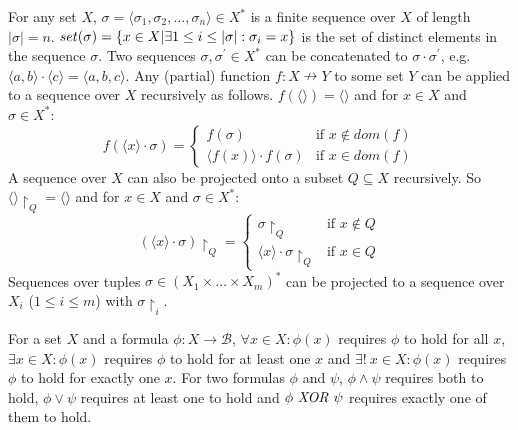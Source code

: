 \begin{definition}[Sequences]
For any set $X$, $\sigma = \langle \sigma_1, \sigma_2, \ldots, \sigma_n \rangle \in X^*$ is a finite sequence over $X$ of length $|\sigma|=n$. $set(\sigma) = \{x\in X|\exists 1 \le i \le |\sigma|: \sigma_i = x\}$ is the set of distinct elements in the sequence $\sigma$.
Two sequences $\sigma, \sigma^\prime \in X^*$ can be concatenated to $\sigma \cdot \sigma^\prime$, e.g. $\langle a,b \rangle \cdot \langle c \rangle = \langle a, b, c \rangle$.
Any (partial) function $f:X \nrightarrow Y$ to some set $Y$ can be applied to a sequence over $X$ recursively as follows. $f(\langle \rangle) = \langle \rangle$ and for $x\in X$ and $\sigma \in X^*$: 
$$f(\langle x \rangle \cdot \sigma) = \begin{cases}
f(\sigma) & \text{if } x\notin dom(f)\\
\langle f(x) \rangle \cdot f(\sigma) & \text{if } x \in dom(f)
\end{cases}$$
A sequence over $X$ can also be projected onto a subset $Q\subseteq X$ recursively. So $\langle \rangle \restriction_Q = \langle \rangle$ and for $x\in X$ and $\sigma \in X^*$: $$(\langle x \rangle \cdot \sigma)\restriction_Q = \begin{cases}
\sigma\restriction_Q & \text{if } x\notin Q\\
\langle x \rangle \cdot \sigma\restriction_Q & \text{if } x \in Q
\end{cases}$$
Sequences over tuples $\sigma \in (X_1 \times \ldots \times X_m)^*$ can be projected to a sequence over $X_i$ ($1\le i\le m$) with $\sigma \restriction_i$.
\end{definition}

\begin{definition}[Logic]
For a set $X$ and a formula $\phi:X\to \mathcal{B}$, $\forall x\in X: \phi(x)$ requires $\phi$ to hold for all $x$, $\exists x\in X: \phi(x)$ requires $\phi$ to hold for at least one $x$ and $\exists!\ x\in X : \phi(x)$ requires $\phi$ to hold for exactly one $x$. For two formulas $\phi$ and $\psi$, $\phi \wedge \psi$ requires both to hold, $\phi \vee \psi$ requires at least one to hold and $\phi \ \mathit{XOR}\  \psi$ requires exactly one of them to hold.
\end{definition}

